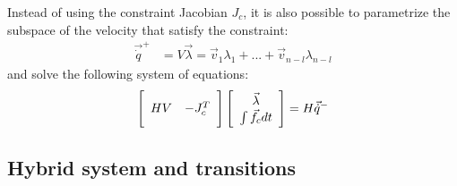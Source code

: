Instead of using the constraint Jacobian $J_c$, it is also possible to parametrize the subspace of the velocity that satisfy the constraint:
%
\begin{align}
\vec{\dot{q}}^+ &= V \vec{\lambda} = \vec{v}_1 \lambda_1  + ... + \vec{v}_{n-l} \lambda_{n-l}
\end{align}
%
and solve the following system of equations:
%
\begin{align}
\Bigg[ \begin{array}{c c } 	H V & -J_c^T  	\end{array} \Bigg] \left[ \begin{array}{c} \vec{\lambda}  \\ \int{ \vec{f}_c dt }\end{array} \right] = H \vec{\dot{q}}^-
\label{eq:manipulator_impact_eom}
\end{align}


\subsection{Hybrid system and transitions}
\label{sec:impact}




